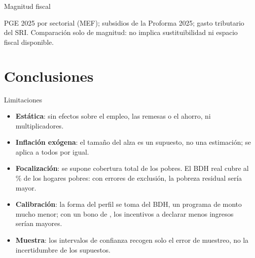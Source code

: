 \documentclass[aspectratio=169,11pt]{beamer}
\newcommand{\usd}[1]{\text{USD~#1}}
\begin{document}
\begin{frame}{Magnitud fiscal}
  \centering
  \tablagasto

  {\tiny PGE 2025 por sectorial (MEF); subsidios de la Proforma 2025; gasto tributario del SRI. Comparación solo de
  magnitud: no implica sustituibilidad ni espacio fiscal disponible.}
\end{frame}

\section{Conclusiones}

\begin{frame}{Limitaciones}
  \begin{itemize}
    \item \textbf{Estática}: sin efectos sobre el empleo, las remesas o el ahorro, ni multiplicadores.
    \item \textbf{Inflación exógena}: el tamaño del alza es un supuesto, no una estimación; se aplica a todos por igual.
    \item \textbf{Focalización}: se supone cobertura total de los pobres. El BDH real cubre al \cBdhCob\% de los
      hogares pobres: con errores de exclusión, la pobreza residual sería mayor.
    \item \textbf{Calibración}: la forma del perfil se toma del BDH, un programa de monto mucho menor; con un bono
      de \usd{\cMonto}, los incentivos a declarar menos ingresos serían mayores.
    \item \textbf{Muestra}: los intervalos de confianza recogen solo el error de muestreo, no la incertidumbre de los
      supuestos.
  \end{itemize}
\end{frame}
\end{document}
